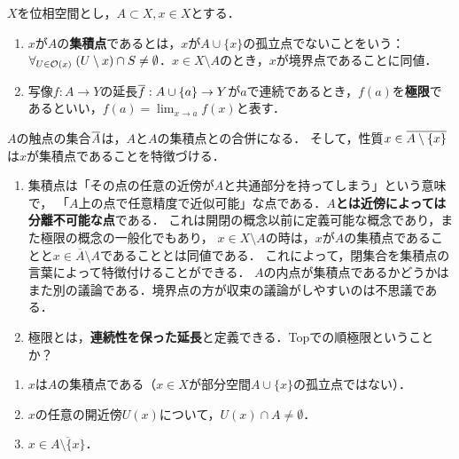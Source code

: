 \documentclass[uplatex,dvipdfmx]{jsreport}
\begin{document}
\begin{definition}\label{def-accumulation-point}
    $X$を位相空間とし，$A\subset X,x\in X$とする．
    \begin{enumerate}
        \item $x$が$A$の\textbf{集積点}であるとは，$x$が$A\cup\{x\}$の孤立点でないことをいう：$\forall_{U\in\mathcal{O}(x)}\;(U\setminus x)\cap S\ne\emptyset$．$x\in X\setminus A$のとき，$x$が境界点であることに同値．
        \item 写像$f:A\to Y$の延長$\overline{f}:A\cup\{a\}\to Y$が$a$で連続であるとき，$f(a)$を\textbf{極限}であるといい，$f(a)=\lim_{x\to a}f(x)$と表す．
    \end{enumerate}
\end{definition}
\begin{remarks}[触点との違い]
    $A$の触点の集合$\overline{A}$は，$A$と$A$の集積点との合併になる．
    そして，性質$x\in\overline{A\setminus\{x\}}$は$x$が集積点であることを特徴づける．
\end{remarks}
\begin{remark}[まさかこんな捉え方があるとは]\mbox{}
    \begin{enumerate}
        \item 集積点は「その点の任意の近傍が$A$と共通部分を持ってしまう」という意味で，
        「$A$上の点で任意精度で近似可能」な点である．\textbf{$A$とは近傍によっては分離不可能な点}である．
        これは開閉の概念以前に定義可能な概念であり，また極限の概念の一般化でもあり，
        $x\in X\setminus A$の時は，$x$が$A$の集積点であることと$x\in\overline{A}\setminus A$であることとは同値である．
        これによって，閉集合を集積点の言葉によって特徴付けることができる．
        $A$の内点が集積点であるかどうかはまた別の議論である．境界点の方が収束の議論がしやすいのは不思議である．
        \item 極限とは，\textbf{連続性を保った延長}と定義できる．Topでの順極限ということか？
    \end{enumerate}
\end{remark}

\begin{lemma}[集積点の特徴付け]\mbox{}
    \begin{enumerate}
        \item $x$は$A$の集積点である（$x\in X$が部分空間$A\cup\{x\}$の孤立点ではない）．
        \item $x$の任意の開近傍$U(x)$について，$U(x)\cap A\ne\emptyset$．
        \item $x\in\overline{A\setminus\{x\}}$．
    \end{enumerate}
\end{lemma}
\end{document}
